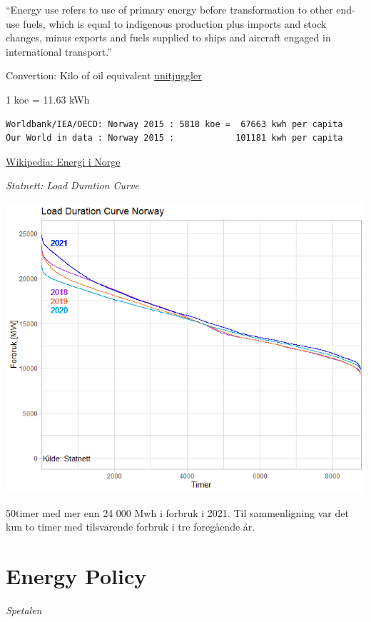 \documentclass[
]{book}
\begin{document}
``Energy use refers to use of primary energy before transformation to other end-use fuels, which is equal to indigenous production plus imports and stock changes, minus exports and fuels supplied to ships and aircraft engaged in international transport.''

Convertion: Kilo of oil equivalent
\href{https://www.unitjuggler.com/convert-energy-from-koe-to-kWh.html}{unitjuggler}

1 koe = 11.63 kWh

\begin{verbatim}
Worldbank/IEA/OECD: Norway 2015 : 5818 koe =  67663 kwh per capita
Our World in data : Norway 2015 :            101181 kwh per capita
\end{verbatim}

\href{https://no.wikipedia.org/wiki/Energi_i_Norge}{Wikipedia: Energi i Norge}

\emph{Statnett: Load Duration Curve}

\includegraphics{fig/Load_duration_Norway.png}

50timer med mer enn 24 000 Mwh i forbruk i 2021. Til sammenligning var det kun to timer med tilsvarende forbruk i tre foregående år.

\hypertarget{energy-policy}{%
\section{Energy Policy}\label{energy-policy}}

\emph{Spetalen}
\end{document}
